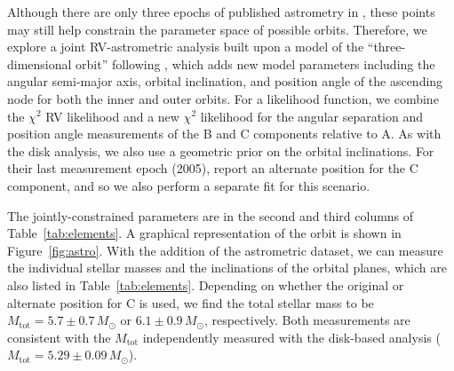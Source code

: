 \documentclass[twocolumn]{aastex61}
\begin{document}
Although there are only three epochs of published astrometry in \citet{berger11}, these points may still help constrain the parameter space of possible orbits. Therefore, we explore a joint RV-astrometric analysis built upon a model of the ``three-dimensional orbit'' following \citet{murray10}, which adds new model parameters including the angular semi-major axis, orbital inclination, and position angle of the ascending node for both the inner and outer orbits. For a likelihood function, we combine the $\chi^2$ RV likelihood and a new $\chi^2$ likelihood for the angular separation and position angle measurements of the B and C components relative to A. As with the disk analysis, we also use a geometric prior on the orbital inclinations. For their last measurement epoch (2005), \citet{berger11} report an alternate position for the C component, and so we also perform a separate fit for this scenario.

The jointly-constrained parameters are in the second and third columns of Table~\ref{tab:elements}.  A graphical representation of the orbit is shown in Figure~\ref{fig:astro}. With the addition of the astrometric dataset, we can measure the individual stellar masses and the inclinations of the orbital planes, which are also listed in Table~\ref{tab:elements}. Depending on whether the original or alternate position for C is used, we find the total stellar mass to be $M_\mathrm{tot} = 5.7 \pm 0.7\,M_\odot$ or $6.1 \pm 0.9\,M_\odot$, respectively. Both measurements are consistent with the $M_\mathrm{tot}$ independently measured with the disk-based analysis ($M_\mathrm{tot} = 5.29 \pm 0.09\,M_\odot$).
\end{document}

